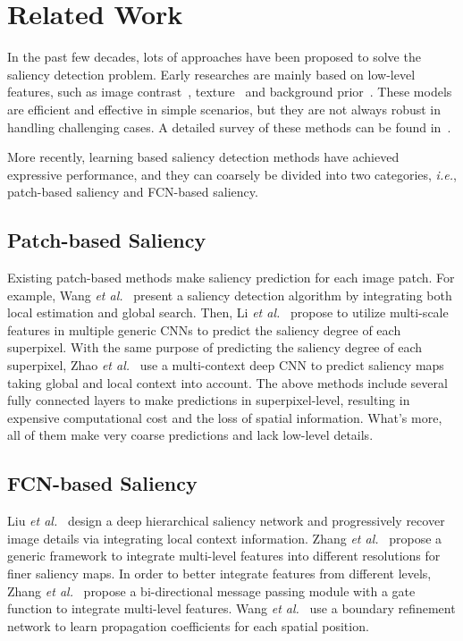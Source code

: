\documentclass[10pt,twocolumn,letterpaper]{article}
\begin{document}
\section{Related Work}
In the past few decades, lots of approaches have been proposed to solve the saliency detection problem. Early researches are mainly based on low-level features, such as image contrast~\cite{itti1998model,cheng2015global}, texture~\cite{yan2013hierarchical,yang2013saliency} and background prior~\cite{li2013saliency,wei2012geodesic}. These models are efficient and effective in simple scenarios, but they are not always robust in handling challenging cases. A detailed survey of these methods can be found in~\cite{borji2015salient}.

More recently, learning based saliency detection methods have achieved expressive performance, and they can coarsely be divided into two categories, \emph{i.e.}, patch-based saliency and FCN-based saliency.
\subsection{Patch-based Saliency}
Existing patch-based methods make saliency prediction for each image patch. For example, Wang \emph{et al.}~\cite{wang2015deep} present a saliency detection algorithm by integrating both local estimation and global search. Then, Li \emph{et al.}~\cite{li2015visual} propose to utilize multi-scale features in multiple generic CNNs to predict the saliency degree of each superpixel. With the same purpose of predicting the saliency degree of each superpixel, Zhao \emph{et al.}~\cite{zhao2015saliency} use a multi-context deep CNN to predict saliency maps taking global and local context into account. The above methods include several fully connected layers to make predictions in superpixel-level, resulting in expensive computational cost and the loss of spatial information. What's more, all of them make very coarse predictions and lack low-level details.
\subsection{FCN-based Saliency}
Liu \emph{et al.}~\cite{liu2016dhsnet} design a deep hierarchical saliency network and progressively recover image details via integrating local context information. Zhang \emph{et al.}~\cite{zhang2017amulet} propose a generic framework to integrate multi-level features into different resolutions for finer saliency maps. In order to better integrate features from different levels, Zhang \emph{et al.}~\cite{zhang2018bi} propose a bi-directional message passing module with a gate function to integrate multi-level features. Wang \emph{et al.}~\cite{wang2018detect} use a boundary refinement network to learn propagation coefficients for each spatial position.
\end{document}

